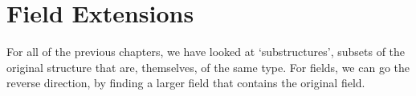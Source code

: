 \chapter{Field Extensions}
For all of the previous chapters, we have looked at `substructures', subsets of the original structure that are, themselves, of the same type. For fields, we can go the reverse direction, by finding a larger field that contains the original field.

